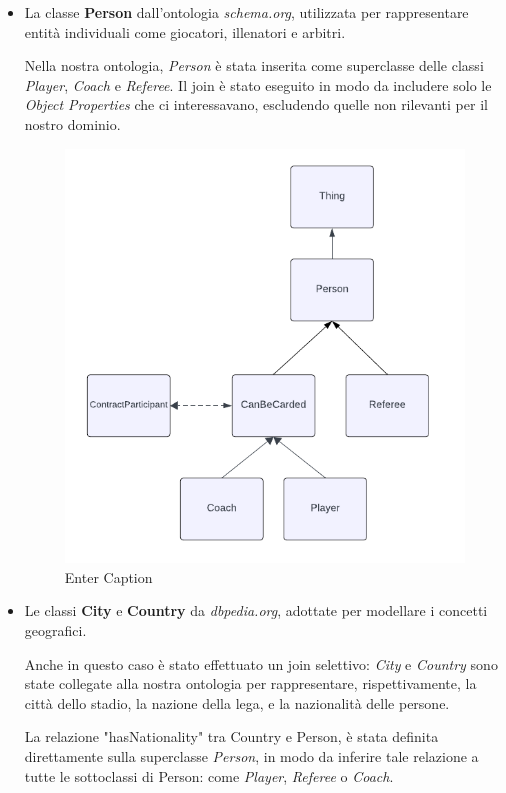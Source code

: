 \documentclass[11pt]{report} %
\begin{document}
\begin{itemize}
  \item La classe \textbf{Person} dall'ontologia \textit{schema.org}, utilizzata per rappresentare entità individuali come giocatori, illenatori e arbitri. 
  
  Nella nostra ontologia, \textit{Person} è stata inserita come superclasse delle classi \textit{Player}, \textit{Coach} e \textit{Referee}. Il join è stato eseguito in modo da includere solo le \textit{Object Properties} che ci interessavano, escludendo quelle non rilevanti  per il nostro dominio.

  \begin{figure}[H]
      \centering
      \includegraphics[width=0.7\linewidth]{PERSON.png}
      \caption{Enter Caption}
  \end{figure}

  \item Le classi \textbf{City} e \textbf{Country} da \textit{dbpedia.org}, adottate per modellare i concetti geografici. 
  
  Anche in questo caso è stato effettuato un join selettivo: \textit{City} e \textit{Country} sono state collegate alla nostra ontologia per rappresentare, rispettivamente, la città dello stadio, la nazione della lega, e la nazionalità delle persone.
  
  La relazione "hasNationality" tra Country e Person, è stata definita direttamente sulla superclasse \textit{Person}, in modo da inferire tale relazione a tutte le sottoclassi di Person: come \textit{Player}, \textit{Referee} o \textit{Coach}.
\end{itemize}
\end{document}
